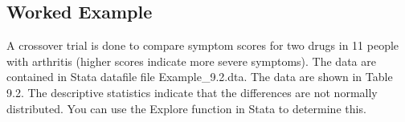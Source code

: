 \documentclass[
]{memoir}
\begin{document}
\hypertarget{worked-example-13}{%
\subsection{Worked Example}\label{worked-example-13}}

A crossover trial is done to compare symptom scores for two drugs in 11 people with arthritis (higher scores indicate more severe symptoms). The data are contained in Stata datafile file Example\_9.2.dta. The data are shown in Table 9.2. The descriptive statistics indicate that the differences are not normally distributed. You can use the Explore function in Stata to determine this.

 
  \providecommand{\huxb}[2]{\arrayrulecolor[RGB]{#1}\global\arrayrulewidth=#2pt}
  \providecommand{\huxvb}[2]{\color[RGB]{#1}\vrule width #2pt}
  \providecommand{\huxtpad}[1]{\rule{0pt}{#1}}
  \providecommand{\huxbpad}[1]{\rule[-#1]{0pt}{#1}}
\end{document}
